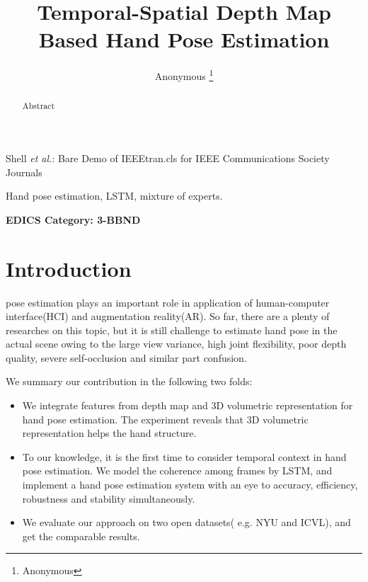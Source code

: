 \documentclass[journal,comsoc]{IEEEtran}
\begin{document}
\title{Temporal-Spatial Depth Map Based Hand Pose Estimation}

\author{{Anonymous}%
\thanks{Anonymous}}

%
{Shell \MakeLowercase{\textit{et al.}}: Bare Demo of IEEEtran.cls for IEEE Communications Society Journals}

\maketitle

\begin{abstract}
Abstract
\end{abstract}

\begin{IEEEkeywords}
Hand pose estimation, LSTM, mixture of experts.
\end{IEEEkeywords}


\ifCLASSOPTIONpeerreview
\begin{center} \bfseries EDICS Category: 3-BBND \end{center}
\fi
%
\IEEEpeerreviewmaketitle



\section{Introduction}\label{sec:introduction}
 pose estimation plays an important role in application of human-computer interface(HCI) and augmentation reality(AR).
So far, there are a plenty of researches on this topic\cite{guo2017region}, but it is still challenge to estimate hand pose in the actual scene
owing to the large view variance, high joint flexibility, poor depth quality, severe self-occlusion and similar part confusion.

We summary our contribution in the following two folds:
\begin{itemize}
  \item
  We integrate features from depth map and 3D volumetric representation for hand pose estimation. 
  The experiment reveals that 3D volumetric representation helps the hand structure.
  \item
  To our knowledge, it is the first time to consider temporal context in hand pose estimation. 
  We model the coherence among frames by LSTM, and implement a hand pose estimation system with an eye to accuracy, 
  efficiency, robustness and stability simultaneously.
  \item
  We evaluate our approach on two open datasets( e.g. NYU and ICVL), and get the comparable results.
\end{itemize}
\end{document}
